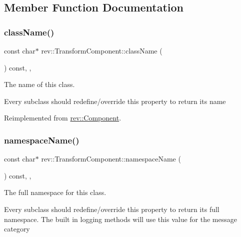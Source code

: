 \subsection{Member Function Documentation}
\mbox{\label{classrev_1_1_transform_component_a04a11c6b0b9f124c53a84226a488a1e9}} 
\subsubsection{\texorpdfstring{className()}{className()}}
{\footnotesize\ttfamily const char$\ast$ rev\+::\+Transform\+Component\+::class\+Name (\begin{DoxyParamCaption}{ }\end{DoxyParamCaption}) const\hspace{0.3cm}{\ttfamily [inline]}, {\ttfamily [override]}, {\ttfamily [virtual]}}



The name of this class. 

Every subclass should redefine/override this property to return its name 

Reimplemented from \mbox{\hyperlink{classrev_1_1_component_a07619152d5acafe7a536df3a6a476349}{rev\+::\+Component}}.

\mbox{\label{classrev_1_1_transform_component_a7dc2abcb1d759a29c28fc8ceb632a31d}} 
\subsubsection{\texorpdfstring{namespaceName()}{namespaceName()}}
{\footnotesize\ttfamily const char$\ast$ rev\+::\+Transform\+Component\+::namespace\+Name (\begin{DoxyParamCaption}{ }\end{DoxyParamCaption}) const\hspace{0.3cm}{\ttfamily [inline]}, {\ttfamily [override]}, {\ttfamily [virtual]}}



The full namespace for this class. 

Every subclass should redefine/override this property to return its full namespace. The built in logging methods will use this value for the message category 

